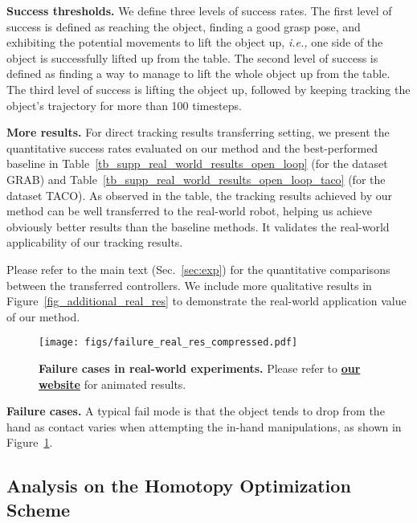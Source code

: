 \noindent\textbf{Success thresholds.} We define three levels of success rates. The first level of success is defined as reaching the object, finding a good grasp pose, and exhibiting the potential movements to lift the object up, \emph{i.e.,} one side of the object is successfully lifted up from the table. The second level of success is defined as finding a way to manage to lift the whole object up from the table. The third level of success is lifting the object up, followed by keeping tracking the object's trajectory for more than 100 timesteps. 

\noindent\textbf{More results.} For direct tracking results transferring setting, we present the quantitative success rates evaluated on our method and the best-performed baseline in Table~\ref{tb_supp_real_world_results_open_loop} (for the dataset GRAB) and Table~\ref{tb_supp_real_world_results_open_loop_taco} (for the dataset TACO). 
As observed in the table, the tracking results achieved by our method can be well transferred to the real-world robot, helping us achieve obviously better results than the baseline methods. It validates the real-world applicability of our tracking results. 

Please refer to the main text (Sec.~\ref{sec:exp}) for the quantitative comparisons between the transferred controllers. 
We include more qualitative results in Figure~\ref{fig_additional_real_res} to demonstrate the real-world application value of our method. 



\begin{figure}[h]
  \centering
  \texttt{[image: figs/failure\_real\_res\_compressed.pdf]}
  \caption{
  \textbf{Failure cases in real-world experiments. }
  Please refer to \textbf{\href{https://projectwebsite7.github.io/gene-dex-manip/}{our website}} for animated results.
  }
  \label{fig_real_failure_cases}
\end{figure}

\textcolor{myblue}{
\noindent\textbf{Failure cases.} A typical fail mode is that the object tends to drop from the hand as contact varies when attempting the in-hand manipulations, as shown in Figure~\ref{fig_real_failure_cases}. 
}



\subsection{Analysis on the Homotopy Optimization Scheme} \label{sec:supp_exp_curriculum}


